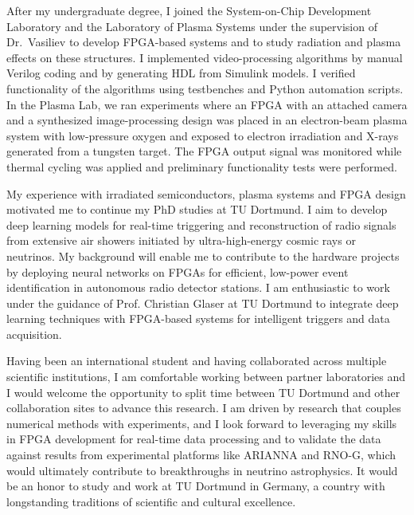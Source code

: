 \documentclass[a4paper,12pt]{article}
\begin{document}
\vspace{10pt}
After my undergraduate degree, I joined the System-on-Chip Development Laboratory and the Laboratory of Plasma Systems under the supervision of Dr.\ Vasiliev to develop FPGA-based systems and to study radiation and plasma effects on these structures. I implemented video-processing algorithms by manual Verilog coding and by generating HDL from Simulink models. I verified functionality of the algorithms using testbenches and Python automation scripts. In the Plasma Lab, we ran experiments where an FPGA with an attached camera and a synthesized image-processing design was placed in an electron-beam plasma system with low-pressure oxygen and exposed to electron irradiation and X-rays generated from a tungsten target. The FPGA output signal was monitored while thermal cycling was applied and preliminary functionality tests were performed. 

\vspace{10pt}
My experience with irradiated semiconductors, plasma systems and FPGA design motivated me to continue my PhD studies at TU Dortmund. I aim to develop deep learning models for real-time triggering and reconstruction of radio signals from extensive air showers initiated by ultra-high-energy cosmic rays or neutrinos. My background will enable me to contribute to the hardware projects by deploying neural networks on FPGAs for efficient, low-power event identification in autonomous radio detector stations. I am enthusiastic to work under the guidance of Prof. Christian Glaser at TU Dortmund to integrate deep learning techniques with FPGA-based systems for intelligent triggers and data acquisition.

\vspace{10pt}
Having been an international student and having collaborated across multiple scientific institutions, I am comfortable working between partner laboratories and I would welcome the opportunity to split time between TU Dortmund and other collaboration sites to advance this research. I am driven by research that couples numerical methods with experiments, and I look forward to leveraging my skills in FPGA development for real-time data processing and to validate the data against results from experimental platforms like ARIANNA and RNO-G, which would ultimately contribute to breakthroughs in neutrino astrophysics. It would be an honor to study and work at TU Dortmund in Germany, a country with longstanding traditions of scientific and cultural excellence.
\end{document}
